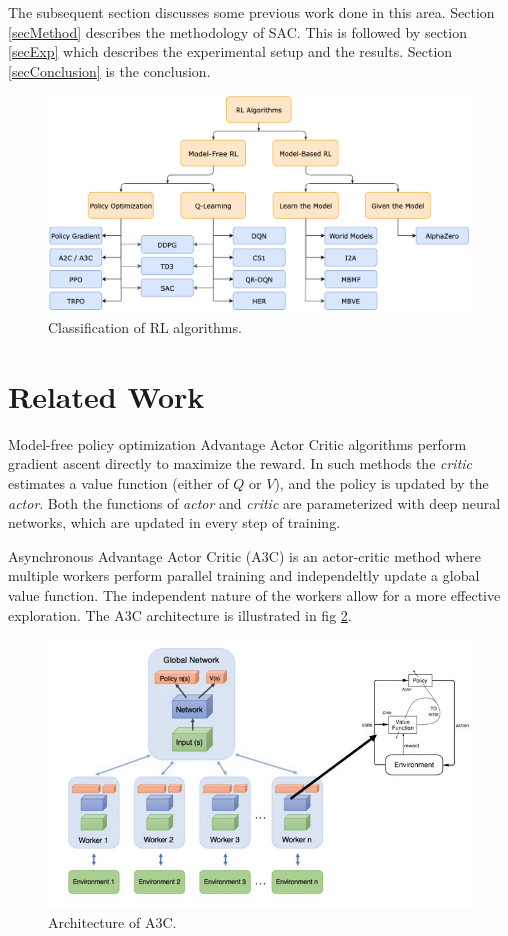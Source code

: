 \documentclass[conference]{IEEEtran}
\begin{document}
The subsequent section discusses some previous work done in this area. Section \ref{secMethod} describes the methodology of SAC. This is followed by section \ref{secExp} which describes the experimental setup and the results. Section \ref{secConclusion} is the conclusion.


\begin{figure}[htbp]
  \centering
  \centerline{\includegraphics[width=\linewidth]{img/figRL-fam.png}}
  \caption{Classification of RL algorithms.}
  \label{figRLFam}
\end{figure}

\section{Related Work}\label{secRelated}
Model-free policy optimization Advantage Actor Critic algorithms perform gradient ascent directly to maximize the reward. In such methods the \textit{critic} estimates a value function (either of $Q$ or $V$), and the policy is updated by the \textit{actor}. Both the functions of \textit{actor} and \textit{critic} are parameterized with deep neural networks, which are updated in every step of training.

Asynchronous Advantage Actor Critic (A3C) \cite{DBLP:journals/corr/MnihBMGLHSK16} is an actor-critic method where multiple workers perform parallel training and independeltly update a global value function. The independent nature of the workers allow for a more effective exploration. The A3C architecture is illustrated in fig \ref{figA3C}.

\begin{figure}[htbp]
  \centering
  \centerline{\includegraphics[width=\linewidth]{img/imgA3C.jpeg}}
  \caption{Architecture of A3C.}
  \label{figA3C}
\end{figure}
\end{document}
